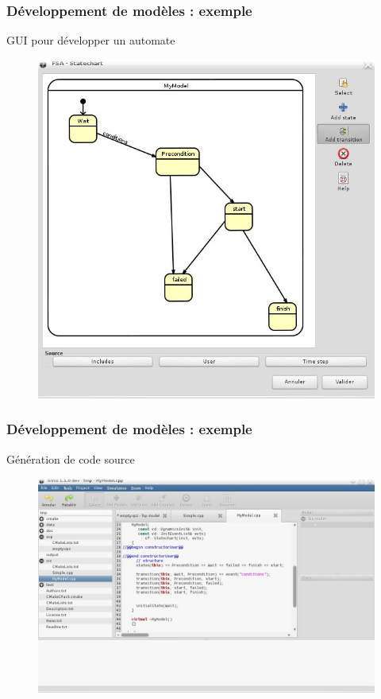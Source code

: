 \documentclass[xetex, compress, table, svgnames]{beamer}
\begin{document}
\begin{frame}
  \frametitle{Développement de modèles : exemple}
  \begin{exampleblock}{GUI pour développer un automate}
    \begin{figure}[htpb]
      \centering
      \includegraphics[width=.6\textwidth]{fsa}
    \end{figure}
  \end{exampleblock}
\end{frame}

\begin{frame}
  \frametitle{Développement de modèles : exemple}
  \begin{exampleblock}{Génération de code source}
    \begin{figure}[htpb]
      \centering
      \includegraphics[width=.95\textwidth]{fsa2}
    \end{figure}
  \end{exampleblock}
\end{frame}
\end{document}
